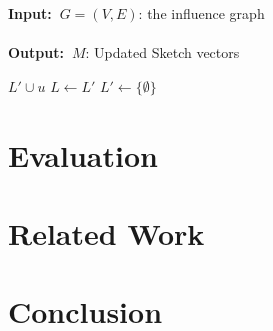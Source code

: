 \documentclass[10pt,journal,compsoc]{IEEEtran}
\renewcommand{\algorithmicrequire}{\textbf{Input:~}}
\renewcommand{\algorithmicensure}{\textbf{Output:~}}
\begin{document}
\begin{algorithm}
\caption{($G,M,J,R_S$)}
\label{algo:newgredy}
\algorithmicrequire{$G = (V,E)$: the influence graph
\\
\\}
\algorithmicensure{$M$: Updated Sketch vectors
}
\begin{algorithmic}[1]
            \For{$j \in (0,J]$}
                \EndIf
            \EndFor
                \State $L' \cup u $
            \EndIf
        \EndFor
        \State $L \leftarrow L'$
        \State $L' \leftarrow \{\emptyset\}$
    \EndWhile
\end{algorithmic}
\end{algorithm}



\section{Evaluation}\label{sec:evaluation}

\section{Related Work}\label{sec:relatedwork}

\section{Conclusion}\label{sec:conclusion}

\ifCLASSOPTIONcaptionsoff
  \newpage
\fi
\end{document}

